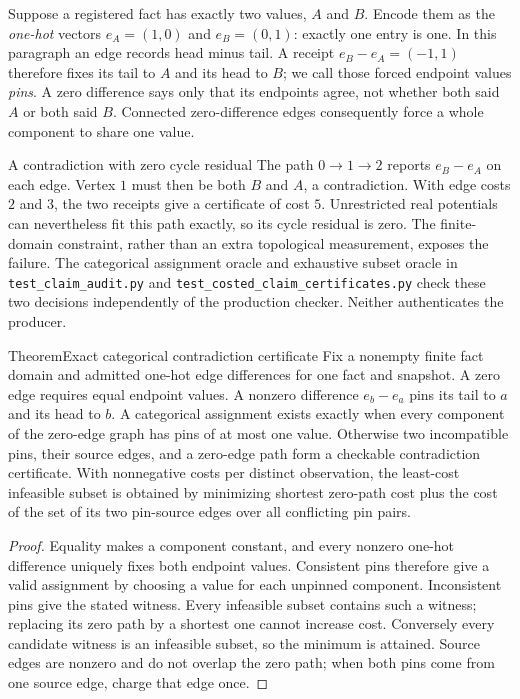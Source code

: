 \documentclass[11pt,a4paper]{article}
\theoremstyle{definition}
\theoremstyle{remark}
\begin{document}
Suppose a registered fact has exactly two values, $A$ and $B$. Encode them
as the \emph{one-hot} vectors $e_A=(1,0)$ and $e_B=(0,1)$: exactly one entry
is one. In this paragraph an edge records head minus tail. A receipt
$e_B-e_A=(-1,1)$ therefore fixes its tail to $A$ and its head to $B$; we call
those forced endpoint values \emph{pins}. A zero difference says only that
its endpoints agree, not whether both said $A$ or both said $B$. Connected
zero-difference edges consequently force a whole component to share one value.

\begin{pdexample}{A contradiction with zero cycle residual}
The path $0\to1\to2$ reports $e_B-e_A$ on each edge. Vertex $1$ must then be
both $B$ and $A$, a contradiction. With edge costs $2$ and $3$, the two receipts
give a certificate of cost $5$. Unrestricted real potentials can nevertheless
fit this path exactly, so its cycle residual is zero. The finite-domain
constraint, rather than an extra topological measurement, exposes the failure.
The categorical assignment oracle and exhaustive subset oracle in
\texttt{test\_claim\_audit.py} and
\mbox{\texttt{test\_costed\_claim\_certificates.py}} check these two decisions
independently of the production checker. Neither authenticates the producer.
\end{pdexample}

\begin{pdclaim}{Theorem}{Exact categorical contradiction certificate}
\label{thm:categorical-certificate}
Fix a nonempty finite fact domain and admitted one-hot edge differences for
one fact and snapshot. A zero edge requires equal endpoint values. A nonzero
difference $e_b-e_a$ pins its tail to $a$ and its head to $b$. A categorical
assignment exists exactly when every component of the zero-edge graph has
pins of at most one value. Otherwise two incompatible pins, their source
edges, and a zero-edge path form a checkable contradiction certificate.
With nonnegative costs per distinct observation, the least-cost infeasible
subset is obtained by minimizing shortest zero-path cost plus the cost of the
set of its two pin-source edges over all conflicting pin pairs.
\end{pdclaim}
\begin{proof}
Equality makes a component constant, and every nonzero one-hot difference
uniquely fixes both endpoint values. Consistent pins therefore give a valid
assignment by choosing a value for each unpinned component. Inconsistent pins
give the stated witness. Every infeasible subset contains such a witness;
replacing its zero path by a shortest one cannot increase cost. Conversely
every candidate witness is an infeasible subset, so the minimum is attained.
Source edges are nonzero and do not overlap the zero path; when both pins
come from one source edge, charge that edge once.
\end{proof}
\end{document}
